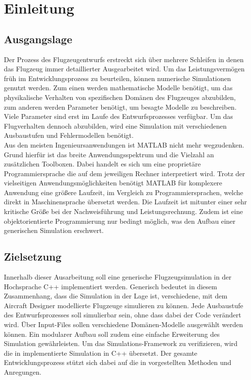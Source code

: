 \chapter{Einleitung}
\section{Ausgangslage}
\label{sec:ausgangslage}
Der Prozess des Flugzeugentwurfs erstreckt sich über mehrere Schleifen in denen das Flugzeug immer detaillierter Ausgearbeitet wird. Um das Leistungsvermögen früh im Entwicklungsprozess zu beurteilen, können numerische Simulationen genutzt werden. Zum einen werden mathematische Modelle benötigt, um das physikalische Verhalten von spezifischen Domänen des Flugzeuges abzubilden, zum anderen werden Parameter benötigt, um besagte Modelle zu beschreiben. Viele Parameter sind erst im Laufe des Entwurfsprozesses verfügbar. Um das Flugverhalten dennoch abzubilden, wird eine Simulation mit verschiedenen Ausbaustufen und Fehlermodellen benötigt.  \\
Aus den meisten Ingenieursanwendungen ist MATLAB nicht mehr wegzudenken. Grund hierfür ist das breite Anwendungsspektrum und die Vielzahl an zusätzlichen Toolboxen. Dabei handelt es sich um eine proprietäre Programmiersprache die auf dem jeweiligen Rechner interpretiert wird. Trotz der vielseitigen Anwendungsmöglichkeiten benötigt MATLAB für komplexere Anwendung eine größere Laufzeit, im Vergleich zu Programmiersprachen, welche direkt in Maschinensprache übersetzt werden. Die Laufzeit ist mitunter einer sehr kritische Größe bei der Nachweisführung und Leistungsrechnung. Zudem ist eine objektorientierte Programmierung nur bedingt möglich, was den Aufbau einer generischen Simulation erschwert.
 
\section{Zielsetzung}
Innerhalb dieser Ausarbeitung soll eine generische Flugzeugsimulation in der Hochsprache C++ implementiert werden. Generisch bedeutet in diesem Zusammenhang, dass die Simulation in der Lage ist, verschiedene, mit dem Aircraft Designer modellierte Flugzeuge simulieren zu können. Jede Ausbaustufe des Entwurfsprozesses soll simulierbar sein, ohne dass dabei der Code verändert wird. Über Input-Files sollen verschiedene Domänen-Modelle ausgewählt werden können.  Ein modularer Aufbau soll zudem eine einfache Erweiterung des Simulation gewährleisten. Um das Simulations-Framework zu verifizieren, wird die in \cite{Olucak.15.02.2017} implementierte Simulation in C++ übersetzt. Der gesamte Entwicklungsprozess stützt sich dabei auf die in \cite{Kessler.Sommersemester2017} vorgestellten Methoden und Anregungen.
 
